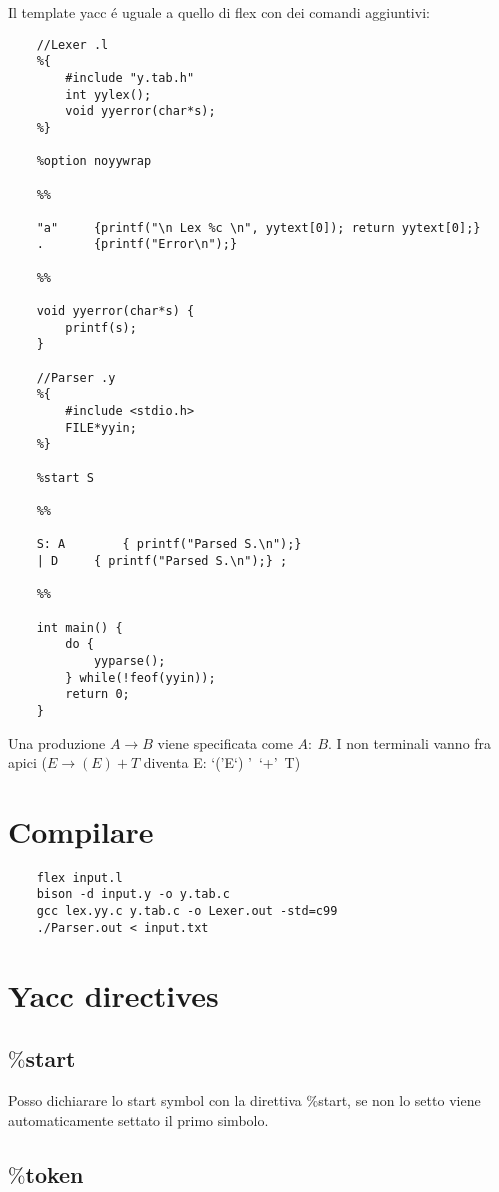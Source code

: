 Il template yacc \'e uguale a quello di flex con dei comandi aggiuntivi:
\begin{lstlisting}
    //Lexer .l
    %{
        #include "y.tab.h"
        int yylex();
        void yyerror(char*s);
    %}

    %option noyywrap

    %%

    "a"     {printf("\n Lex %c \n", yytext[0]); return yytext[0];}
    .	    {printf("Error\n");}

    %%

    void yyerror(char*s) {
        printf(s);
    }

    //Parser .y
    %{
        #include <stdio.h>
        FILE*yyin;
    %}

    %start S

    %%

    S: A		{ printf("Parsed S.\n");}
    | D		{ printf("Parsed S.\n");} ;

    %%

    int main() {
        do {
            yyparse();
        } while(!feof(yyin));
        return 0;
    }
\end{lstlisting} 

Una produzione $A \rightarrow B$ viene specificata come $A:\ B$. I non terminali vanno fra apici 
($E \rightarrow (E) + T$ diventa E: \lq (\rq E\lq ) \rq\ \lq +\rq\ T)

\section{Compilare}
\begin{lstlisting}
    flex input.l
    bison -d input.y -o y.tab.c 
    gcc lex.yy.c y.tab.c -o Lexer.out -std=c99
    ./Parser.out < input.txt
\end{lstlisting}

\section{Yacc directives}

\subsection{$\%$start}
Posso dichiarare lo start symbol con la direttiva $\%$start, se non lo setto viene automaticamente settato il primo simbolo.

\subsection{$\%$token}

